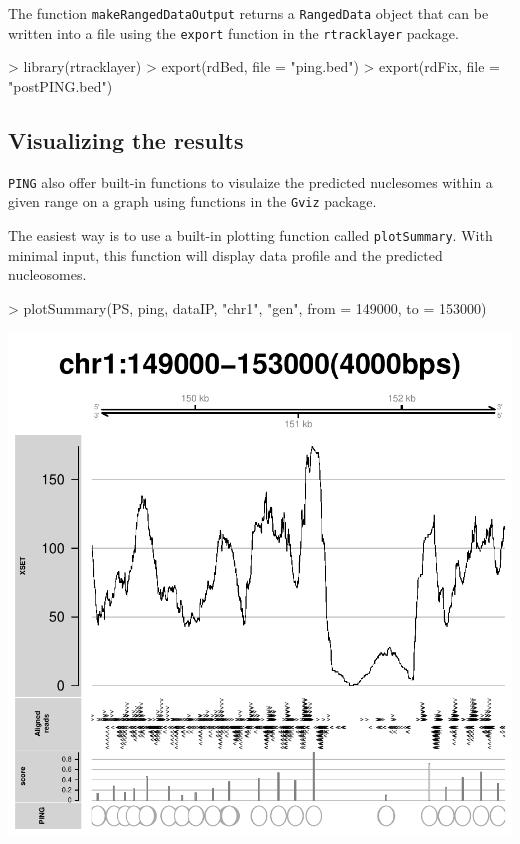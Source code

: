 \documentclass[11pt]{article}
\begin{document}
The function \texttt{makeRangedDataOutput} returns a \texttt{RangedData} object that can be written into a file using the \texttt{export} function in the \texttt{rtracklayer} package.
\begin{Schunk}
\begin{Sinput}
> library(rtracklayer)
> export(rdBed, file = "ping.bed")
> export(rdFix, file = "postPING.bed")
\end{Sinput}
\end{Schunk}

\subsection{Visualizing the results}
\texttt{PING} also offer built-in functions to visulaize the predicted nuclesomes within a given range on a graph using functions in the \texttt{Gviz} package.

The easiest way is to use a built-in plotting function called \texttt{plotSummary}. With minimal input, this function will display data profile and the predicted nucleosomes.
\begin{Schunk}
\begin{Sinput}
> plotSummary(PS, ping, dataIP, "chr1", "gen", from = 149000, to = 153000)
\end{Sinput}
\end{Schunk}
\includegraphics{PING-plotSummary}
\end{document}
